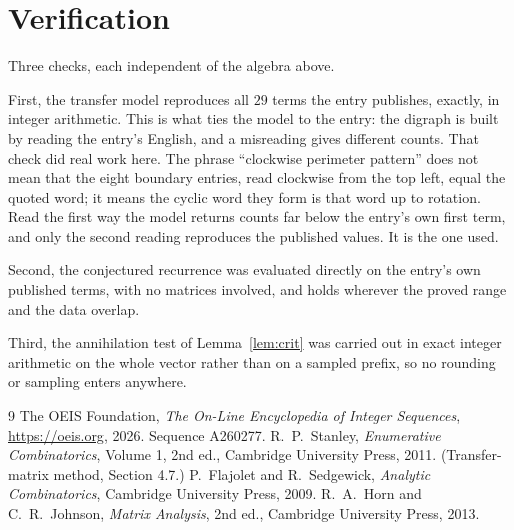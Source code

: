 \documentclass[11pt,a4paper]{article}
\theoremstyle{plain}
\theoremstyle{definition}
\begin{document}
\section{Verification}

Three checks, each independent of the algebra above.

First, the transfer model reproduces all $29$ terms the entry publishes, exactly, in
integer arithmetic. This is what ties the model to the entry: the digraph is built by reading
the entry's English, and a misreading gives different counts. That check did real work here. The phrase ``clockwise perimeter pattern'' does not mean that the eight boundary entries, read clockwise from the top left, equal the quoted word; it means the cyclic word they form is that word up to rotation. Read the first way the model returns counts far below the entry's own first term, and only the second reading reproduces the published values. It is the one used.

Second, the conjectured recurrence was evaluated directly on the entry's own published terms,
with no matrices involved, and holds wherever the proved range and the data overlap.

Third, the annihilation test of Lemma~\ref{lem:crit} was carried out in exact integer
arithmetic on the whole vector rather than on a sampled prefix, so no rounding or sampling
enters anywhere.

\begin{thebibliography}{9}
 The OEIS Foundation, \emph{The On-Line Encyclopedia of Integer
Sequences}, \url{https://oeis.org}, 2026. Sequence A260277.
 R.~P.~Stanley, \emph{Enumerative Combinatorics}, Volume 1, 2nd ed.,
Cambridge University Press, 2011. (Transfer-matrix method, Section 4.7.)
 P.~Flajolet and R.~Sedgewick, \emph{Analytic Combinatorics}, Cambridge
University Press, 2009.
 R.~A.~Horn and C.~R.~Johnson, \emph{Matrix Analysis}, 2nd ed., Cambridge
University Press, 2013.
\end{thebibliography}
\end{document}
